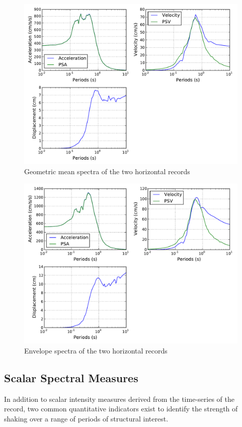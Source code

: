 \begin{figure}[htb]
	\centering
		\includegraphics[width=12cm]{./figures/ims/geometric_mean_spectrum.pdf}
	\caption{Geometric mean spectra of the two horizontal records}
	\label{fig:geometric}
\end{figure}
\begin{figure}[htb]
	\centering
		\includegraphics[width=12cm]{./figures/ims/envelope_spectrum.pdf}
	\caption{Envelope spectra of the two horizontal records}
	\label{fig:envelope}
\end{figure}

\subsection{Scalar Spectral Measures}

In addition to scalar intensity measures derived from the time-series of the record, two common quantitative indicators exist to identify the strength of shaking over a range of periods of structural interest.

